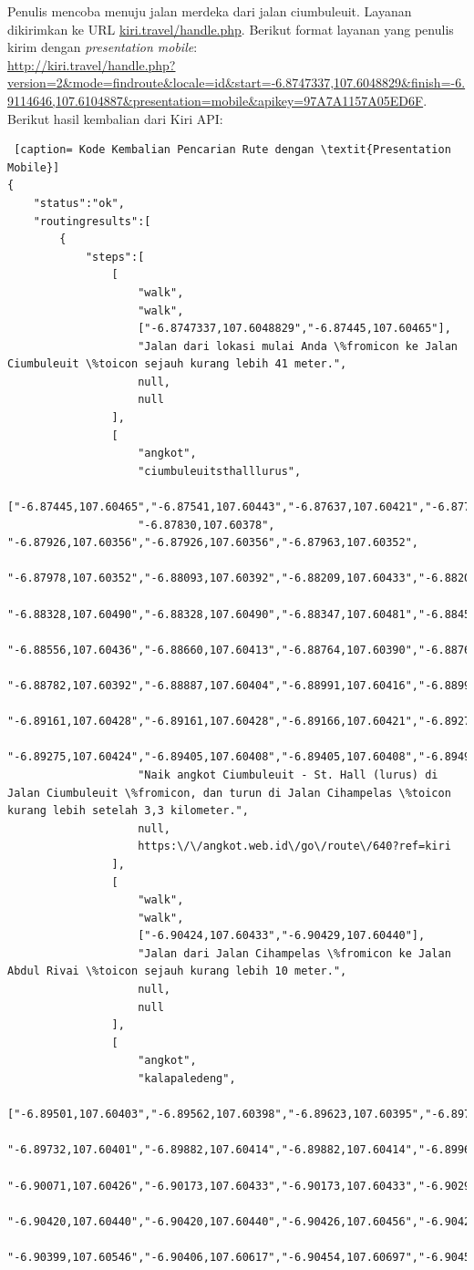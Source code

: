 Penulis mencoba menuju jalan merdeka dari jalan ciumbuleuit. Layanan dikirimkan ke URL \url{kiri.travel/handle.php}. Berikut format layanan yang penulis kirim dengan \textit{presentation mobile}:\\ \url{http://kiri.travel/handle.php?version=2&mode=findroute&locale=id&start=-6.8747337,107.6048829&finish=-6.9114646,107.6104887&presentation=mobile&apikey=97A7A1157A05ED6F}.\\
\newline
Berikut hasil kembalian dari Kiri API:
\begin{lstlisting} [caption= Kode Kembalian Pencarian Rute dengan \textit{Presentation Mobile}]
{
	"status":"ok",
	"routingresults":[
		{
			"steps":[
				[
					"walk",
					"walk",
					["-6.8747337,107.6048829","-6.87445,107.60465"],
					"Jalan dari lokasi mulai Anda \%fromicon ke Jalan Ciumbuleuit \%toicon sejauh kurang lebih 41 meter.",
					null,
					null
				],
				[
					"angkot",
					"ciumbuleuitsthalllurus",
					["-6.87445,107.60465","-6.87541,107.60443","-6.87637,107.60421","-6.87734,107.60400",
					"-6.87830,107.60378", "-6.87926,107.60356","-6.87926,107.60356","-6.87963,107.60352",
					"-6.87978,107.60352","-6.88093,107.60392","-6.88209,107.60433","-6.88209,107.60433",
					"-6.88328,107.60490","-6.88328,107.60490","-6.88347,107.60481","-6.88452,107.60459",
					"-6.88556,107.60436","-6.88660,107.60413","-6.88764,107.60390","-6.88764,107.60391",
					"-6.88782,107.60392","-6.88887,107.60404","-6.88991,107.60416","-6.88991,107.60416",
					"-6.89161,107.60428","-6.89161,107.60428","-6.89166,107.60421","-6.89275,107.60424",
					"-6.89275,107.60424","-6.89405,107.60408","-6.89405,107.60408","-6.89496,107.60400"],
					"Naik angkot Ciumbuleuit - St. Hall (lurus) di Jalan Ciumbuleuit \%fromicon, dan turun di Jalan Cihampelas \%toicon kurang lebih setelah 3,3 kilometer.",
					null,
					https:\/\/angkot.web.id\/go\/route\/640?ref=kiri
				],
				[
					"walk",
					"walk",
					["-6.90424,107.60433","-6.90429,107.60440"],
					"Jalan dari Jalan Cihampelas \%fromicon ke Jalan Abdul Rivai \%toicon sejauh kurang lebih 10 meter.",
					null,
					null
				],
				[
					"angkot",
					"kalapaledeng",
					["-6.89501,107.60403","-6.89562,107.60398","-6.89623,107.60395","-6.89732,107.60401",
					"-6.89732,107.60401","-6.89882,107.60414","-6.89882,107.60414","-6.89969,107.60418",
					"-6.90071,107.60426","-6.90173,107.60433","-6.90173,107.60433","-6.90297,107.60437",
					"-6.90420,107.60440","-6.90420,107.60440","-6.90426,107.60456","-6.90422,107.60481",
					"-6.90399,107.60546","-6.90406,107.60617","-6.90454,107.60697","-6.90454,107.60697",

\end{lstlisting}
